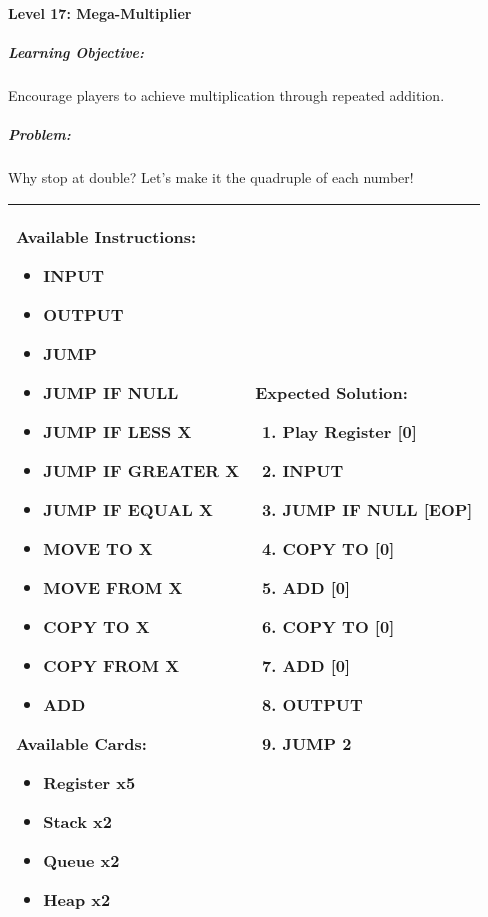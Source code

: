 \paragraph{Level 17: Mega-Multiplier}
\subparagraph{Learning Objective:} Encourage players to achieve multiplication through repeated addition.

\subparagraph{Problem:} Why stop at double? Let's make it the quadruple of each number!

\begin{center}
    \begin{tabular}{ | m{5cm} | m{9cm} | } 
        \hline
            \textbf{Available Instructions:} 
            \begin{itemize}
                \setlength\itemsep{-.35em}
                \item INPUT
                \item OUTPUT
                \item JUMP
                \item JUMP IF NULL
                \item JUMP IF LESS X
                \item JUMP IF GREATER X
		\item JUMP IF EQUAL X
                \item MOVE TO X
                \item MOVE FROM X
                \item COPY TO X
                \item COPY FROM X
		\item ADD
            \end{itemize}
            \textbf{Available Cards:} 
            \begin{itemize}
                \setlength\itemsep{-.35em}
                \item Register x5
		\item Stack x2
                \item Queue x2
                \item Heap x2
            \end{itemize}& 
            \textbf{Expected Solution:} 
            \begin{enumerate}
                \setlength\itemsep{-.35em}
		\item Play Register [0]
                \item INPUT
		\item JUMP IF NULL [EOP]
		\item COPY TO [0]
		\item ADD [0]
		\item COPY TO [0]
		\item ADD [0]
		\item OUTPUT
		\item JUMP 2
            \end{enumerate}
            \\
        \hline
    \end{tabular}
\end{center}


